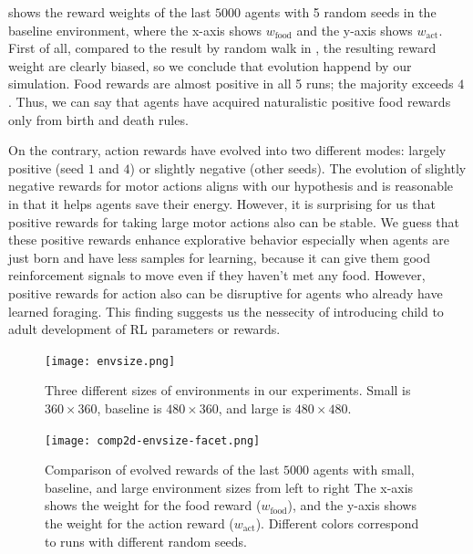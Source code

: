  shows the reward weights of the last $5000$ agents with 5 random seeds in the baseline environment, where the x-axis shows $w_{\mathrm{food}}$ and the y-axis shows $w_{\mathrm{act}}$. First of all, compared to the result by random walk in , the resulting reward weight are clearly biased, so we conclude that evolution happend by our simulation. Food rewards are almost positive in all 5 runs; the majority exceeds $4$. Thus, we can say that agents have acquired naturalistic positive food rewards only from birth and death rules.

On the contrary, action rewards have evolved into two different modes: largely positive (seed $1$ and $4$) or slightly negative (other seeds). The evolution of slightly negative rewards for motor actions aligns with our hypothesis and is reasonable in that it helps agents save their energy. However, it is surprising for us that positive rewards for taking large motor actions also can be stable. We guess that these positive rewards enhance explorative behavior especially when agents are just born and have less samples for learning, because it can give them good reinforcement signals to move even if they haven't met any food. However, positive rewards for action also can be disruptive for agents who already have learned foraging. This finding suggests us the nessecity of introducing child to adult development of RL parameters or rewards.

\begin{figure}[t]
  \centering
  \texttt{[image: envsize.png]}
  \caption{
    Three different sizes of environments in our experiments. Small is $360\times360$, baseline is $480\times360$, and large is $480\times480$.
  }\label{figure:envsize}
\end{figure}

\begin{figure}[t]
  \centering
  \texttt{[image: comp2d-envsize-facet.png]}
  \caption{
    Comparison of evolved rewards of the last $5000$ agents with small, baseline, and large environment sizes from left to right
    The x-axis shows the weight for the food reward ($w_{\mathrm{food}}$), and the y-axis shows the weight for the action reward ($w_{\mathrm{act}}$).
    Different colors correspond to runs with different random seeds.
  }\label{figure:result-envsize}
\end{figure}

